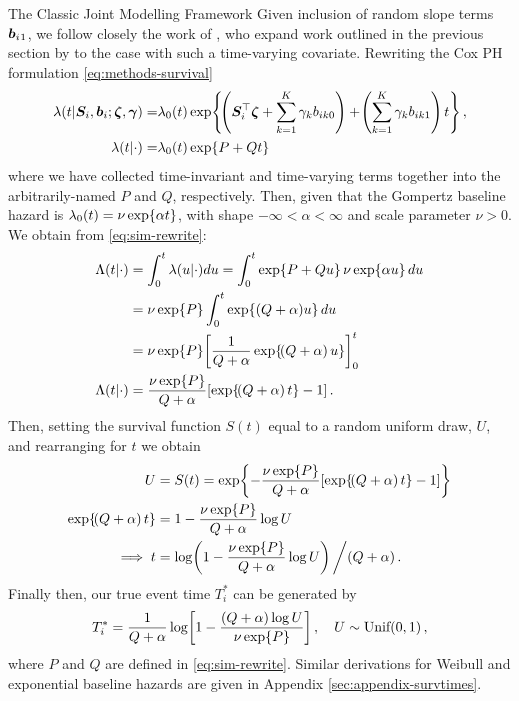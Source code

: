 \begin{chapter}{\label{cha:methods-classic}The Classic Joint Modelling Framework}
  Given inclusion of random slope terms $\bm{b}_i{_1}$, we follow closely the work of \citet{Austin2012}, who expand work outlined in the previous section by \citet{Bender2005} to the case with such a time-varying covariate. Rewriting the Cox PH formulation \eqref{eq:methods-survival}
  \begin{equation}
  \begin{aligned}
      \lambda(t|\bm{S}_i,\bm{b}_i;\bm{\zeta},\bm{\gamma})=&\lambda_0(t)\exp\!\left\{\!\left(\bm{S}_i^\top\bm{\zeta}+\sum_{k=1}^K\gamma_kb_{ik0}\right) + 
      \!\left(\sum_{k=1}^K\gamma_kb_{ik1}\right) t\right\},\\
      \lambda(t|\cdot)=&\lambda_0(t)\exp\!\left\{ P + Qt\right\}
  \end{aligned}
  \label{eq:sim-rewrite}
  \end{equation}
  where we have collected time-invariant and time-varying terms together into the arbitrarily-named $P$ and $Q$, respectively. Then, given that the Gompertz baseline hazard is $\lambda_0(t)=\nu\exp\!\left\{\alpha t\right\}$, with shape $-\infty<\alpha<\infty$ and scale parameter $\nu>0$. We obtain from \eqref{eq:sim-rewrite}:
  \begin{align*}
      \Lambda(t|\cdot)&=\intzt\lambda(u|\cdot)du=\intzt\exp\lbr P+Qu\rbr\nu\exp\lbr\alpha u\rbr du\\
      &=\nu\exp\lbr P\rbr\intzt\exp\lbr (Q + \alpha)u\rbr du\\
      &=\nu\exp\lbr P\rbr\ls\frac{1}{Q + \alpha}\exp\lbr\lb Q + \alpha\rb u\rbr\rs^t_0\\
      \Lambda(t|\cdot)&=\frac{\nu\exp\lbr P\rbr}{Q + \alpha}\ls\exp\lbr\lb Q+\alpha\rb t\rbr-1\rs.
  \end{align*}
  Then, setting the survival function $S(t)$ equal to a random uniform draw, $U$, and rearranging for $t$ we obtain
  \begin{align*}
      U&=S\lb t\rb=\exp\lbr-\frac{\nu\exp\lbr P\rbr}{Q + \alpha}\ls\exp\lbr\lb Q + \alpha\rb t\rbr-1\rs\rbr\\
      \exp\lbr\lb Q + \alpha\rb t\rbr&=1-\frac{\nu\exp\lbr P\rbr}{Q + \alpha}\log U\\
      \implies t&=\log\lb1-\frac{\nu\exp\lbr P\rbr}{Q + \alpha}\log U\rb\bigg /\lb Q + \alpha\rb.
  \end{align*}
  Finally then, our true event time $T_i^*$ can be generated by
  \begin{equation}
      T_i^*=\frac{1}{Q+\alpha}\log\!\left[1-\frac{(Q+\alpha)\log U}{\nu\exp\!\left\{ P\right\}}\right],\quad U\sim\text{Unif}\!\left(0,1\right),
  \label{eq:sim-jm}
  \end{equation}
  where $P$ and $Q$ are defined in \eqref{eq:sim-rewrite}. Similar derivations for Weibull and exponential baseline hazards are given in Appendix \ref{sec:appendix-survtimes}. 


\end{chapter}
